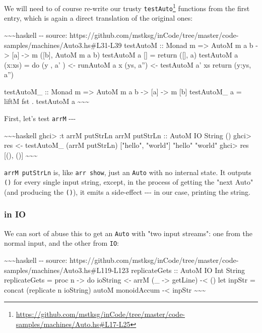 \documentclass[]{article}
\renewcommand{\href}[2]{#2\footnote{\url{#1}}}
\begin{document}
We will need to of course re-write our trusty
\href{https://github.com/mstksg/inCode/tree/master/code-samples/machines/Auto.hs\#L17-L25}{\texttt{testAuto}}
functions from the first entry, which is again a direct translation of the
original ones:

\textasciitilde{}\textasciitilde{}\textasciitilde{}haskell -\/- source:
https://github.com/mstksg/inCode/tree/master/code-samples/machines/Auto3.hs\#L31-L39
testAutoM :: Monad m =\textgreater{} AutoM m a b -\textgreater{} {[}a{]}
-\textgreater{} m ({[}b{]}, AutoM m a b) testAutoM a {[}{]} = return ({[}{]}, a)
testAutoM a (x:xs) = do (y , a' ) \textless{}- runAutoM a x (ys, a'')
\textless{}- testAutoM a' xs return (y:ys, a'')

testAutoM\_ :: Monad m =\textgreater{} AutoM m a b -\textgreater{} {[}a{]}
-\textgreater{} m {[}b{]} testAutoM\_ a = liftM fst . testAutoM a
\textasciitilde{}\textasciitilde{}\textasciitilde{}

First, let's test \texttt{arrM} -\/-\/-

\textasciitilde{}\textasciitilde{}\textasciitilde{}haskell ghci\textgreater{} :t
arrM putStrLn arrM putStrLn :: AutoM IO String () ghci\textgreater{} res
\textless{}- testAutoM\_ (arrM putStrLn) {[}"hello", "world"{]} "hello" "world"
ghci\textgreater{} res {[}(), (){]}
\textasciitilde{}\textasciitilde{}\textasciitilde{}

\texttt{arrM\ putStrLn} is, like \texttt{arr\ show}, just an \texttt{Auto} with
no internal state. It outputs \texttt{()} for every single input string, except,
in the process of getting the "next Auto" (and producing the \texttt{()}), it
emits a side-effect -\/-\/- in our case, printing the string.

\subsubsection{in IO}

We can sort of abuse this to get an \texttt{Auto} with "two input streams": one
from the normal input, and the other from \texttt{IO}:

\textasciitilde{}\textasciitilde{}\textasciitilde{}haskell -\/- source:
https://github.com/mstksg/inCode/tree/master/code-samples/machines/Auto3.hs\#L119-L123
replicateGets :: AutoM IO Int String replicateGets = proc n -\textgreater{} do
ioString \textless{}- arrM (\_ -\textgreater{} getLine) -\textless{} () let
inpStr = concat (replicate n ioString) autoM monoidAccum -\textless{} inpStr
\textasciitilde{}\textasciitilde{}\textasciitilde{}
\end{document}
